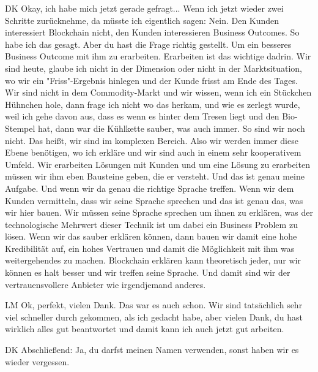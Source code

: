 \begin{xlist}
     \item[DK] Okay, ich habe mich jetzt gerade gefragt... Wenn ich jetzt wieder zwei Schritte zurücknehme, da müsste ich eigentlich sagen: Nein. Den Kunden interessiert Blockchain nicht, den Kunden interessieren Business Outcomes. So habe ich das gesagt. Aber du hast die Frage richtig gestellt. Um ein besseres Business Outcome mit ihm zu erarbeiten. Erarbeiten ist das wichtige dadrin.  Wir sind heute, glaube ich nicht in der Dimension oder nicht in der Marktsituation, wo wir ein "Friss"-Ergebnis hinlegen und der Kunde frisst am Ende des Tages. Wir sind nicht in dem Commodity-Markt und wir wissen, wenn ich ein Stückchen Hühnchen hole, dann frage ich nicht wo das herkam,  und wie es zerlegt wurde, weil ich gehe davon aus, dass es wenn es hinter dem Tresen liegt und den Bio-Stempel hat, dann war die Kühlkette sauber, was auch immer. So sind wir noch nicht. Das heißt, wir sind im komplexen Bereich. Also wir werden immer diese Ebene benötigen, wo ich erkläre und wir sind auch in einem sehr kooperativem Umfeld. Wir erarbeiten Lösungen mit Kunden und um eine Lösung zu erarbeiten müssen wir ihm eben Bausteine geben,  die er versteht. Und das ist genau meine Aufgabe. Und wenn wir da genau die richtige Sprache treffen. Wenn wir dem Kunden vermitteln, dass wir seine Sprache sprechen und das ist genau das, was wir hier bauen. Wir müssen seine Sprache sprechen um ihnen zu erklären, was der technologische Mehrwert dieser Technik ist um dabei ein Business Problem zu lösen. Wenn wir das sauber erklären können, dann bauen wir damit eine hohe Kredibilität auf, ein hohes Vertrauen und damit die Möglichkeit mit ihm was weitergehendes zu machen. Blockchain erklären kann theoretisch jeder, nur wir können es halt besser und wir treffen seine Sprache. Und damit sind wir der vertrauensvollere Anbieter wie irgendjemand anderes.
     \item[LM] Ok, perfekt, vielen Dank. Das war es auch schon. Wir sind tatsächlich sehr viel schneller durch gekommen, als ich gedacht habe, aber vielen Dank, du hast wirklich alles gut beantwortet und damit kann ich auch jetzt gut arbeiten.
     \item[DK] Abschließend: Ja, du darfst meinen Namen verwenden, sonst haben wir es wieder vergessen. 
\end{xlist}

\label{anhang:InterviewRB}


